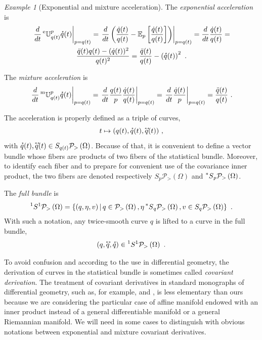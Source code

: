 \documentclass[axioms,article,submit,pdftex,moreauthors]{Definitions/mdpi}
\theoremstyle{plain}
\theoremstyle{remark}
\newtheorem{myexample}{Example}
\newcommand{\Expectation}{\mathbb E}
\newcommand{\acceleration}[1]{\accentset{**}{#1}}
\newcommand{\derivby}[1]{\frac{d}{d#1}}
\newcommand{\etransport}[2]{\prescript{\text{e}}{} {\mathbb U} _ {#1} ^ {#2}}
\newcommand{\fullbundleat}[1]{\prescript{1}{}S^1\pdensitieson{#1}}
\newcommand{\expectat}[2]{\Expectation_{#1}\left[#2\right]}
\newcommand{\expfibreat}[2]{S_{#1}\pdensitieson{#2}}
\newcommand{\mixfibreat}[2]{\prescript{*}{}{S}_{#1}\pdensitieson{#2}}
\newcommand{\mtransport}[2]{\prescript{\text{m}}{} {\mathbb U} _ {#1} ^ {#2}}
\newcommand{\pdensitieson}[1]{\mathcal P_{>}\left(#1\right)}
\newcommand{\setof}[2]{\left\{#1 \, \middle| \, #2 \right\}}
\newcommand{\velocity}[1]{\accentset{\star}{#1}}
\begin{document}
\begin{myexample}[Exponential and mixture acceleration] The \emph{exponential acceleration} is
\begin{multline}
\left. \derivby t \etransport{q(t)}{p} \velocity q(t) \right|_{p = q(t)} = \left. \derivby t \left(\frac{\dot q(t)}{q(t)} - \expectat p {\frac{\dot q(t)}{q(t)}}\right) \right|_{p = q(t)} = \derivby t \frac{\dot q(t)}{q(t)} = \\
\frac{\ddot q(t) q(t) - (\dot q(t))^2}{q(t)^2} = \frac{\ddot q(t)}{q(t)} - \left(\velocity q(t)\right)^2 \ . \end{multline}

The \emph{mixture acceleration} is
\begin{equation}
\left. \derivby t \mtransport{q(t)}{p} \velocity q(t) \right|_{p = q(t)} =\left. \derivby t \frac{q(t)}{p} \frac{\dot q(t)}{q(t)} \right|_{p = q(t)} =
\left. \derivby t \frac{\dot q(t)}{p} \right|_{p = q(t)} = \frac{\ddot q(t)}{q(t)} \ . \end{equation}
\end{myexample}

The acceleration is properly defined as a triple of curves,
\begin{equation*}
    t \mapsto (q(t), \velocity q(t), \acceleration q(t)) \ ,
\end{equation*}
with $\velocity q(t), \acceleration q(t) \in \expfibreat{q(t)}{\Omega}$. Because of that, it is convenient to define a vector bundle whose fibers are products of two fibers of the statistical bundle. Moreover, to identify each fiber and to prepare for convenient use of the covariance inner product, the two fibers are denoted respectively $\expfibreat{p}{\Omega}$ and $\mixfibreat p \Omega$.
 
The \emph{full bundle} is
\begin{equation*} 
\fullbundleat{\Omega} = \setof{(q,\eta,v)}{q \in \pdensitieson\Omega, \eta \mixfibreat q \Omega, v \in \expfibreat{q}{\Omega}} \ .
\end{equation*} 
With such a notation, any twice-smooth curve $q$ is lifted to a curve in the full bundle,
\begin{equation*}
    (q,\acceleration q, \velocity q) \in \fullbundleat \Omega \ .
\end{equation*}

To avoid confusion and according to the use in differential geometry, the derivation of curves in the statistical bundle is sometimes called \emph{covariant derivation}. The treatment of covariant derivatives in standard monographs of differential geometry, such as, for example, \cite{lang:1995} and \cite{docarmo:1992}, is less elementary than ours because we are considering the particular case of affine manifold endowed with an inner product instead of a general differentiable manifold or a general Riemannian manifold. We will need in some cases to distinguish with obvious notations between exponential and mixture covariant derivatives.
\end{document}

